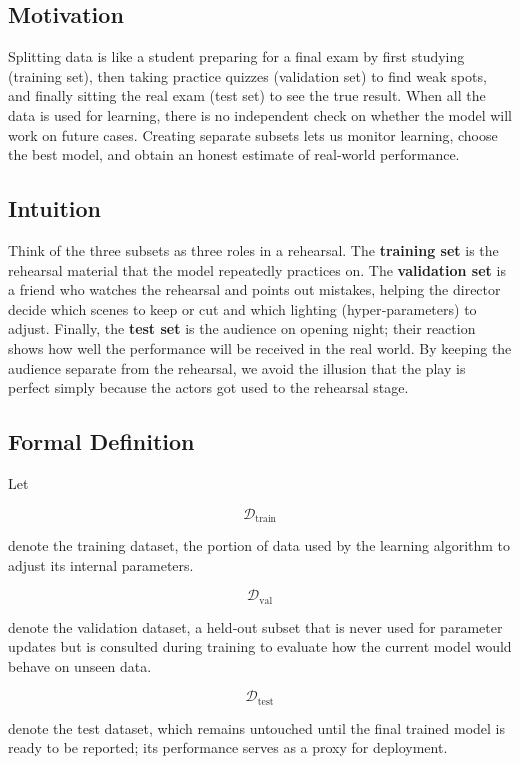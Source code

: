 \documentclass[12pt, a4paper]{article}
\begin{document}
\subsection{Motivation}
Splitting data is like a student preparing for a final exam by first studying (training set), then taking practice quizzes (validation set) to find weak spots, and finally sitting the real exam (test set) to see the true result.  
When all the data is used for learning, there is no independent check on whether the model will work on future cases.  
Creating separate subsets lets us monitor learning, choose the best model, and obtain an honest estimate of real‑world performance.

\subsection{Intuition}
Think of the three subsets as three roles in a rehearsal. The \textbf{training set} is the rehearsal material that the model repeatedly practices on. The \textbf{validation set} is a friend who watches the rehearsal and points out mistakes, helping the director decide which scenes to keep or cut and which lighting (hyper‑parameters) to adjust. Finally, the \textbf{test set} is the audience on opening night; their reaction shows how well the performance will be received in the real world. By keeping the audience separate from the rehearsal, we avoid the illusion that the play is perfect simply because the actors got used to the rehearsal stage.

\subsection{Formal Definition}
Let  

\[
\mathcal{D}_{\text{train}}
\]

denote the training dataset, the portion of data used by the learning algorithm to adjust its internal parameters.  

\[
\mathcal{D}_{\text{val}}
\]

denote the validation dataset, a held‑out subset that is never used for parameter updates but is consulted during training to evaluate how the current model would behave on unseen data.  

\[
\mathcal{D}_{\text{test}}
\]

denote the test dataset, which remains untouched until the final trained model is ready to be reported; its performance serves as a proxy for deployment.  
\end{document}
